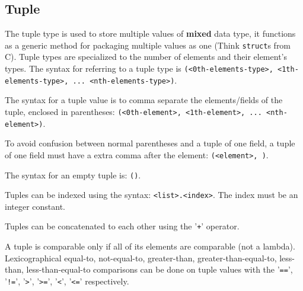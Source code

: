 
\subsection{Tuple}
{
	The tuple type is used to store
	multiple values of \textbf{mixed} data type,
	it functions as a generic method for packaging multiple values
	as one (Think \texttt{struct}s from C).
	Tuple types are specialized to the number of elements and their element's
	types. The syntax for referring to a tuple type
	is \texttt{(<0th-elements-type>, <1th-elements-type>, ... <nth-elements-type>)}.
	
	The syntax for a tuple value is to comma separate the elements/fields
	of the tuple, enclosed in
	parentheses: \texttt{(<0th-element>, <1th-element>, ... <nth-element>)}.
	
	To avoid confusion between normal parentheses
	and a tuple of one field, a tuple of one field must have a extra comma after
	the element: \texttt{(<element>, )}.
	
	The syntax for an empty tuple is: \texttt{()}.
	
	Tuples can be indexed using the
	syntax: \texttt{<list>.<index>}. The
	index must be an integer constant.
	
	Tuples can be concatenated to each other using the '\texttt{+}' operator.
	
	A tuple is comparable only if all of its elements are comparable (not a lambda).
	Lexicographical equal-to, not-equal-to, greater-than, greater-than-equal-to,
	less-than, less-than-equal-to comparisons can be done on tuple values with
	the '\texttt{==}', '\texttt{!=}',
	'\texttt{>}', '\texttt{>=}', '\texttt{<}', '\texttt{<=}' respectively.
}
